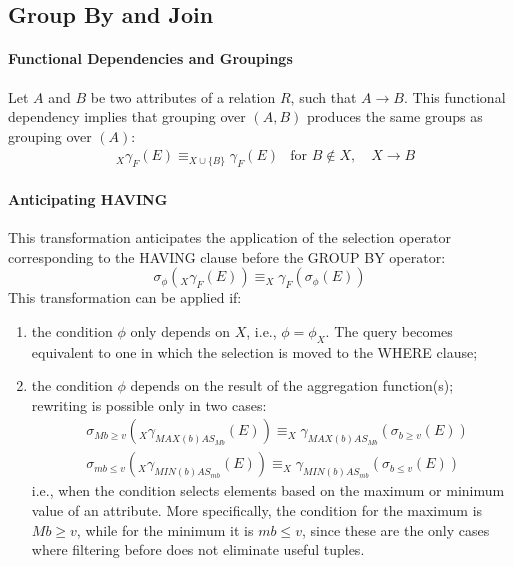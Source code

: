 \subsection{Group By and Join}

\paragraph{Functional Dependencies and Groupings} Let $A$ and $B$ be two attributes of a relation $R$, such that $A \rightarrow B$. This functional dependency implies that grouping over $(A,B)$ produces the same groups as grouping over $(A)$:
\begin{align*}
    &_X \gamma_F (E) \equiv _{X \cup \{B\}}\gamma_F (E) &\text{for }B \not \in X, \quad X \rightarrow B
\end{align*}

\paragraph{Anticipating HAVING} This transformation anticipates the application of the selection operator corresponding to the HAVING clause before the GROUP BY operator:
\begin{equation*}
    \sigma_{\phi}(_X \gamma_F (E)) \equiv _X \gamma_F (\sigma_{\phi}(E))
\end{equation*}
This transformation can be applied if:
\begin{enumerate}[noitemsep]
    \item the condition $\phi$ only depends on $X$, i.e., $\phi = \phi_X$. The query becomes equivalent to one in which the selection is moved to the WHERE clause;
    \item the condition $\phi$ depends on the result of the aggregation function(s); rewriting is possible only in two cases:
    \begin{align*}
        &\sigma_{\textit{Mb} \geq v}(_X \gamma_{\textit{MAX}(b) AS _\textit{{Mb}}}(E)) \equiv _X \gamma_{\textit{MAX}(b) AS _\textit{{Mb}}}(\sigma_{b \geq v}(E)) \\
        &\sigma_{\textit{mb} \leq v} (_X\gamma_{\textit{MIN}(b) AS _{\textit{mb}}} (E)) \equiv _X\gamma_{\textit{MIN}(b) AS _{\textit{mb}}}(\sigma_{b \leq v}(E)) 
    \end{align*}
    i.e., when the condition selects elements based on the maximum or minimum value of an attribute. More specifically, the condition for the maximum is $\textit{Mb} \geq v$, while for the minimum it is $\textit{mb} \leq v$, since these are the only cases where filtering before does not eliminate useful tuples.
\end{enumerate}

